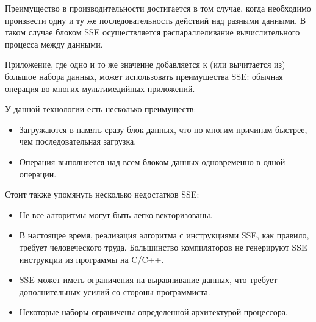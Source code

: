 \begin{figure}[ht!]
\end{figure}

Преимущество в производительности достигается в том случае, когда необходимо произвести одну и ту же последовательность действий над разными данными. В таком случае блоком SSE осуществляется распараллеливание вычислительного процесса между данными.

Приложение, где одно и то же значение добавляется к (или вычитается из) большое набора данных, может использовать преимущества SSE: обычная операция во многих мультимедийных приложений.

У данной технологии есть несколько преимуществ:
\begin{itemize}
	\item Загружаются в память сразу блок данных, что по многим причинам быстрее, чем последовательная загрузка.
	\item Операция выполняется над всем блоком данных одновременно в одной операции.
\end{itemize}

Стоит также упомянуть несколько недостатков SSE:
\begin{itemize}
	\item Не все алгоритмы могут быть легко векторизованы.
	\item В настоящее время, реализация алгоритма с инструкциями SSE, как правило, требует человеческого труда. Большинство компиляторов не генерируют SSE инструкции из программы на C/C++.
	\item SSE может иметь ограничения на выравнивание данных, что требует дополнительных усилий со стороны программиста.
	\item Некоторые наборы ограничены определенной архитектурой процессора.
\end{itemize}



